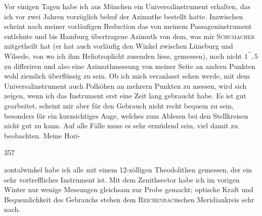 \par\noindent\hspace*{\parindent}Vor einigen Tagen habe ich aus München ein Universalinstrument erhalten, das ich vor zwei Jahren vorzüglich behuf der Azimuthe bestellt hatte.
Inzwischen scheint nach meiner vorläufigen Reduction das von meinem Passageninstrument entlehnte und bis Hamburg übertragene Azimuth von dem, was mir \textsc{Schumacher} mitgetheilt hat (er hat auch vorläufig den Winkel zwischen Lüneburg und Wilsede, von wo ich ihm Heliotroplicht zusenden liess, gemessen), noch nicht \(1^{\prime\prime}{,}5\) zu differiren und also eine Azimuthmessung von meiner Seite an andern Punkten wohl ziemlich überflüssig zu sein.
Ob ich mich veranlasst sehen werde, mit dem Universalinstrument auch Polhöhen an mehrern Punkten zu messen, wird sich zeigen, wenn ich das Instrument erst eine Zeit lang gebraucht habe.
Es ist gut gearbeitet, scheint mir aber für den Gebrauch nicht recht bequem zu sein, besonders für ein kurzsichtiges Auge, welches zum Ablesen bei den Stellkreisen nicht gut zu kann.
Auf alle Fälle muss es sehr ermüdend sein, viel damit zu beobachten.
Meine Hori-
\par\clearpage
{}\hfill357\par\medskip
\noindent zontalwinkel habe ich alle mit einem 12-zölligen Theodolithen gemessen, der ein sehr vortreffliches Instrument ist.
Mit dem Zenithsector habe ich im vorigen Winter nur wenige Messungen gleichsam zur Probe gemacht; optische Kraft und Bequemlichkeit des Gebrauchs stehen dem \textsc{Reichenbach}schen Meridiankreis sehr nach.

